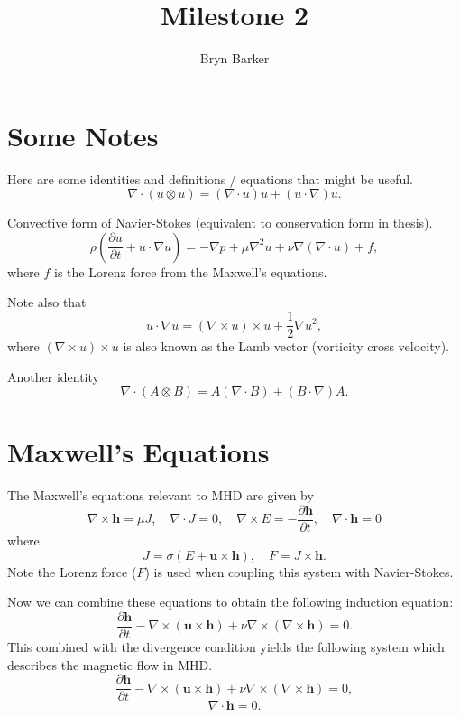\documentclass{article}
\begin{document}
\title{Milestone 2}
\author{Bryn Barker}

\maketitle

\section*{Some Notes}
Here are some identities and definitions / equations that might be useful. 
\[
\nabla \cdot (u \otimes u) = (\nabla \cdot u)u+(u\cdot \nabla)u.
\]

Convective form of Navier-Stokes (equivalent to conservation form in thesis).
\[
\rho \left( \frac{\partial u}{\partial t} + u \cdot \nabla u \right) = -\nabla p + \mu \nabla ^2u + \nu \nabla (\nabla \cdot u) + f,
\]
where $f$ is the Lorenz force from the Maxwell's equations. 

Note also that 
\[
u\cdot \nabla u = (\nabla \times u)\times u+ \frac{1}{2} \nabla u^2,
\]
where $(\nabla \times u)\times u$ is also known as the Lamb vector (vorticity cross velocity).

Another identity
\[
\nabla \cdot (A \otimes B) = A(\nabla \cdot B) + (B \cdot \nabla ) A.
\]

\section*{Maxwell's Equations}
The Maxwell's equations relevant to MHD are given by
\[\nabla \times \boldsymbol{h} = \mu J,\quad \nabla \cdot J=0,\quad \nabla \times E = -\frac{\partial \boldsymbol{h} }{\partial t},\quad \nabla \cdot \boldsymbol{h} = 0\]
where \[ J = \sigma (E + \boldsymbol{u}\times \boldsymbol{h}),\quad F = J\times \boldsymbol{h}.\]
Note the Lorenz force ($F$) is used when coupling this system with Navier-Stokes.

Now we can combine these equations to obtain the following induction equation:
\[
    \frac{\partial \boldsymbol{h} }{\partial t} - \nabla \times (\boldsymbol{u}\times \boldsymbol{h}) + \nu \nabla \times (\nabla \times \boldsymbol{h}) = 0.
\]
This combined with the divergence condition yields the following system which describes the magnetic flow in MHD.
\begin{equation}\label{eqn:mag1}
    \frac{\partial \boldsymbol{h} }{\partial t} - \nabla \times (\boldsymbol{u}\times \boldsymbol{h}) + \nu \nabla \times (\nabla \times \boldsymbol{h}) = 0,
\end{equation}
\begin{equation}\label{eqn:mag2}
    \nabla \cdot \boldsymbol{h} = 0.
\end{equation}
\end{document}
